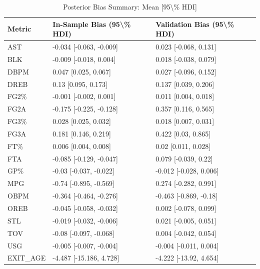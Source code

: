 \begin{table}[t]
\caption*{
{\fontsize{20}{25}\selectfont  Posterior Bias Summary: Mean [95\textbackslash{}\% HDI]\fontsize{12}{15}\selectfont }
} 
\fontsize{12.0pt}{14.0pt}\selectfont
\begin{tabular*}{\linewidth}{@{\extracolsep{\fill}}lll}
\toprule
Metric & In-Sample Bias (95\textbackslash{}\% HDI) & Validation Bias (95\textbackslash{}\% HDI) \\ 
\midrule\addlinespace[2.5pt]
AST & -0.034 [-0.063, -0.009] & 0.023 [-0.068, 0.131] \\ 
BLK & -0.009 [-0.018, 0.004] & 0.018 [-0.038, 0.079] \\ 
DBPM & 0.047 [0.025, 0.067] & 0.027 [-0.096, 0.152] \\ 
DREB & 0.13 [0.095, 0.173] & 0.137 [0.039, 0.206] \\ 
FG2\% & -0.001 [-0.002, 0.001] & 0.011 [0.004, 0.018] \\ 
FG2A & -0.175 [-0.225, -0.128] & 0.357 [0.116, 0.565] \\ 
FG3\% & 0.028 [0.025, 0.032] & 0.018 [0.007, 0.031] \\ 
FG3A & 0.181 [0.146, 0.219] & 0.422 [0.03, 0.865] \\ 
FT\% & 0.006 [0.004, 0.008] & 0.02 [0.011, 0.028] \\ 
FTA & -0.085 [-0.129, -0.047] & 0.079 [-0.039, 0.22] \\ 
GP\% & -0.03 [-0.037, -0.022] & -0.012 [-0.028, 0.006] \\ 
MPG & -0.74 [-0.895, -0.569] & 0.274 [-0.282, 0.991] \\ 
OBPM & -0.364 [-0.464, -0.276] & -0.463 [-0.869, -0.18] \\ 
OREB & -0.045 [-0.058, -0.032] & 0.002 [-0.078, 0.099] \\ 
STL & -0.019 [-0.032, -0.006] & 0.021 [-0.005, 0.051] \\ 
TOV & -0.08 [-0.097, -0.068] & 0.004 [-0.042, 0.054] \\ 
USG & -0.005 [-0.007, -0.004] & -0.004 [-0.011, 0.004] \\ 
EXIT\_AGE & -4.487 [-15.186, 4.728] & -4.222 [-13.92, 4.654] \\ 
\bottomrule
\end{tabular*}
\end{table}

